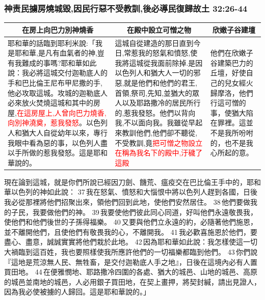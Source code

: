 \subsubsection{神责民擄房燒城毀,因民行惡不受教訓,後必導民復歸故土 32:26-44}
\begin{table}[H]
\centering
\begin{tabular}{p{7.5cm}|p{6.750cm}|p{3.0cm}}\hline\hline
\multicolumn{1}{c|}{在房上向巴力別神燒香}&\multicolumn{1}{c|}{在殿中設立可憎之物}&\multicolumn{1}{c}{欣嫩子谷建壇}\\\hline
耶和華的話臨到耶利米說:「我是耶和華,是凡有血氣者的神,豈有我難成的事嗎?耶和華如此說：我必將這城交付迦勒底人的手和巴比倫王尼布甲尼撒的手,他必攻取這城。攻城的迦勒底人必來放火焚燒這城和其中的房屋,\textcolor{red}{在這房屋上,人曾向巴力燒香,向別神澆奠，惹我發怒}。以色列人和猶大人自從幼年以來，專行我眼中看為惡的事，以色列人盡以手所做的惹我發怒。這是耶和華說的。
&這城自從建造的那日直到今日,常惹我的怒氣和憤怒,使我將這城從我面前除掉.是因以色列人和猶大人一切的邪惡,就是他們和他們的君王,首領,祭司,先知,並猶大的眾人以及耶路撒冷的居民所行的,惹我發怒。他們以背向我,不以面向我。我雖從早起來教訓他們,他們卻不聽從,不受教訓,竟\textcolor{red}{把可憎之物設立在稱為我名下的殿中,汙穢了這殿}
&他們在欣嫩子谷建築巴力的丘壇，好使自己的兒女經火歸摩洛，他們行這可憎的事，使猶大陷在罪裡。這並不是我所吩咐的，也不是我心所起的意。\\\hline
\end{tabular}
\end{table}

現在論到這城，就是你們所說已經因刀劍、饑荒、瘟疫交在巴比倫王手中的，耶和華以色列的神如此說： 37 我在怒氣、憤怒和大惱恨中將以色列人趕到各國，日後我必從那裡將他們招聚出來，領他們回到此地，使他們安然居住。 38 他們要做我的子民，我要做他們的神。 39 我要使他們彼此同心同道，好叫他們永遠敬畏我，使他們和他們後世的子孫得福樂。 40 又要與他們立永遠的約，必隨著他們施恩，並不離開他們，且使他們有敬畏我的心，不離開我。 41 我必歡喜施恩於他們，要盡心、盡意，誠誠實實將他們栽於此地。 42 因為耶和華如此說：我怎樣使這一切大禍臨到這百姓，我也要照樣使我所應許他們的一切福樂都臨到他們。 43 你們說『這地是荒涼無人民、無牲畜，是交付迦勒底人手之地』，日後在這境內必有人置買田地。 44 在便雅憫地、耶路撒冷四圍的各處、猶大的城邑、山地的城邑、高原的城邑並南地的城邑，人必用銀子買田地，在契上畫押，將契封緘，請出見證人，因為我必使被擄的人歸回。這是耶和華說的。」
